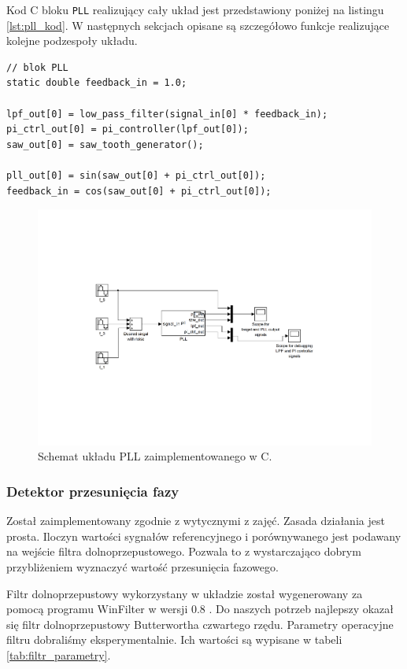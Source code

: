 \noindent Kod C bloku \texttt{PLL} realizujący cały układ jest przedstawiony
poniżej na listingu \ref{lst:pll_kod}. W następnych sekcjach opisane są
szczegółowo funkcje realizujące kolejne podzespoły układu.

\begin{lstlisting}[caption={Implementacja układu PLL w C.}, label=lst:pll_kod]
// blok PLL
static double feedback_in = 1.0;

lpf_out[0] = low_pass_filter(signal_in[0] * feedback_in);
pi_ctrl_out[0] = pi_controller(lpf_out[0]);
saw_out[0] = saw_tooth_generator();

pll_out[0] = sin(saw_out[0] + pi_ctrl_out[0]);
feedback_in = cos(saw_out[0] + pi_ctrl_out[0]);
\end{lstlisting}

\begin{figure}[h]
    \centering
    \includegraphics[angle=180, trim=5cm 5cm 5cm 5cm]{./figury/schemat-koncowy}
    \caption{Schemat układu PLL zaimplementowanego w C.}
    \label{fig:pll}
\end{figure}

\subsubsection{Detektor przesunięcia fazy}
Został zaimplementowany zgodnie z wytycznymi z zajęć. Zasada działania jest
prosta. Iloczyn wartości sygnałów referencyjnego i porównywanego jest podawany
na wejście filtra dolnoprzepustowego. Pozwala to z wystarczająco dobrym
przybliżeniem wyznaczyć wartość przesunięcia fazowego.

Filtr dolnoprzepustowy wykorzystany w układzie został wygenerowany za pomocą
programu WinFilter w wersji 0.8 \cite{filtr_site}. Do naszych potrzeb
najlepszy okazał się filtr dolnoprzepustowy Butterwortha czwartego rzędu.
Parametry operacyjne filtru dobraliśmy eksperymentalnie. Ich wartości są
wypisane w tabeli \ref{tab:filtr_parametry}.

